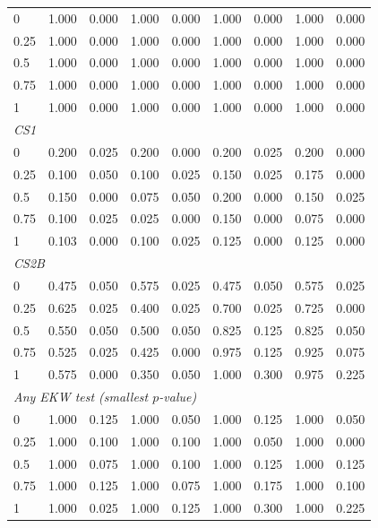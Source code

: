 \begin{table}[htbp]
\begin{tabular}{lcccccccc}
0 & 1.000 & 0.000 & 1.000 & 0.000 & 1.000 & 0.000 & 1.000 & 0.000 \\
0.25 & 1.000 & 0.000 & 1.000 & 0.000 & 1.000 & 0.000 & 1.000 & 0.000 \\
0.5 & 1.000 & 0.000 & 1.000 & 0.000 & 1.000 & 0.000 & 1.000 & 0.000 \\
0.75 & 1.000 & 0.000 & 1.000 & 0.000 & 1.000 & 0.000 & 1.000 & 0.000 \\
1 & 1.000 & 0.000 & 1.000 & 0.000 & 1.000 & 0.000 & 1.000 & 0.000 \\
\midrule
\multicolumn{9}{l}{\textit{CS1}} \\
0 & 0.200 & 0.025 & 0.200 & 0.000 & 0.200 & 0.025 & 0.200 & 0.000 \\
0.25 & 0.100 & 0.050 & 0.100 & 0.025 & 0.150 & 0.025 & 0.175 & 0.000 \\
0.5 & 0.150 & 0.000 & 0.075 & 0.050 & 0.200 & 0.000 & 0.150 & 0.025 \\
0.75 & 0.100 & 0.025 & 0.025 & 0.000 & 0.150 & 0.000 & 0.075 & 0.000 \\
1 & 0.103 & 0.000 & 0.100 & 0.025 & 0.125 & 0.000 & 0.125 & 0.000 \\
\midrule
\multicolumn{9}{l}{\textit{CS2B}} \\
0 & 0.475 & 0.050 & 0.575 & 0.025 & 0.475 & 0.050 & 0.575 & 0.025 \\
0.25 & 0.625 & 0.025 & 0.400 & 0.025 & 0.700 & 0.025 & 0.725 & 0.000 \\
0.5 & 0.550 & 0.050 & 0.500 & 0.050 & 0.825 & 0.125 & 0.825 & 0.050 \\
0.75 & 0.525 & 0.025 & 0.425 & 0.000 & 0.975 & 0.125 & 0.925 & 0.075 \\
1 & 0.575 & 0.000 & 0.350 & 0.050 & 1.000 & 0.300 & 0.975 & 0.225 \\
\midrule
\multicolumn{9}{l}{\textit{Any EKW test (smallest $p$-value)}} \\
0 & 1.000 & 0.125 & 1.000 & 0.050 & 1.000 & 0.125 & 1.000 & 0.050 \\
0.25 & 1.000 & 0.100 & 1.000 & 0.100 & 1.000 & 0.050 & 1.000 & 0.000 \\
0.5 & 1.000 & 0.075 & 1.000 & 0.100 & 1.000 & 0.125 & 1.000 & 0.125 \\
0.75 & 1.000 & 0.125 & 1.000 & 0.075 & 1.000 & 0.175 & 1.000 & 0.100 \\
1 & 1.000 & 0.025 & 1.000 & 0.125 & 1.000 & 0.300 & 1.000 & 0.225 \\
\bottomrule
\end{tabular}
\par\smallskip

\end{table}

